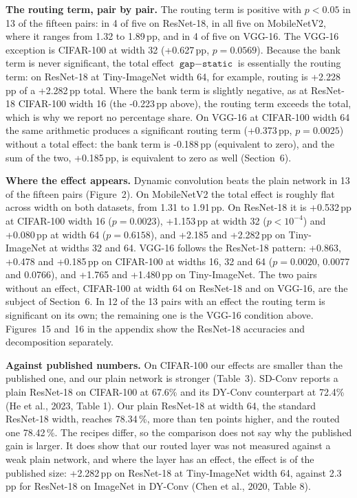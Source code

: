\documentclass{article}
\begin{document}
\textbf{The routing term, pair by pair.}  The routing term is positive with $p<0.05$
in 13 of the fifteen pairs: in 4 of five on ResNet-18,
in all five on MobileNetV2, where it ranges from 1.32 to
1.89\,pp, and in 4 of five on VGG-16. The VGG-16
exception is CIFAR-100 at width 32 (+0.627\,pp, $p=0.0569$).
Because the bank term is never significant, the total effect
$\texttt{gap}-\texttt{static}$ is essentially the routing term: on
ResNet-18 at Tiny-ImageNet width 64, for example, routing is
+2.228\,pp of a +2.282\,pp total. Where the bank term is slightly
negative, as at ResNet-18 CIFAR-100 width 16 (the -0.223\,pp above),
the routing term exceeds the total, which is why we report no percentage
share. On VGG-16 at CIFAR-100 width 64 the same arithmetic produces a
significant routing term (+0.373\,pp, $p=0.0025$) without a
total effect: the bank term is -0.188\,pp (equivalent to zero), and
the sum of the two, +0.185\,pp, is equivalent to zero as well
(Section~6).

\textbf{Where the effect appears.}  Dynamic convolution beats the plain
network in 13 of the fifteen pairs (Figure~2). On
MobileNetV2 the total effect is roughly flat across width on both
datasets, from 1.31 to 1.91\,pp. On ResNet-18 it is
+0.532\,pp at CIFAR-100 width 16 ($p=0.0023$), +1.153\,pp at width
32 ($p<10^{-4}$) and +0.080\,pp at width 64 ($p=0.6158$), and
+2.185 and +2.282\,pp on Tiny-ImageNet at widths 32 and 64. VGG-16
follows the ResNet-18 pattern: +0.863, +0.478 and
+0.185\,pp on CIFAR-100 at widths 16, 32 and 64
($p=0.0020$, 0.0077 and 0.0766), and +1.765 and
+1.480\,pp on Tiny-ImageNet. The two pairs without an effect, CIFAR-100
at width 64 on ResNet-18 and on VGG-16, are the subject of
Section~6. In 12 of the 13 pairs with an
effect the routing term is significant on its own; the remaining one is
the VGG-16 condition above. Figures~15 and~16
in the appendix show the ResNet-18 accuracies and decomposition
separately.

\textbf{Against published numbers.}  On CIFAR-100 our effects are
smaller than the published one, and our plain network is stronger
(Table~3). SD-Conv reports a plain ResNet-18 on CIFAR-100 at
67.6\% and its DY-Conv counterpart at 72.4\%
(He et al., 2023, Table 1). Our plain ResNet-18 at width 64, the
standard ResNet-18 width, reaches 78.34\,\%, more than ten points
higher, and the routed one 78.42\,\%. The recipes differ, so the
comparison does not say why the published gain is larger. It does show
that our routed layer was not measured against a weak plain network, and
where the layer has an effect, the effect is of the published size:
+2.282\,pp on ResNet-18 at Tiny-ImageNet width 64, against
2.3 pp for ResNet-18 on ImageNet in DY-Conv
(Chen et al., 2020, Table 8).
\end{document}
